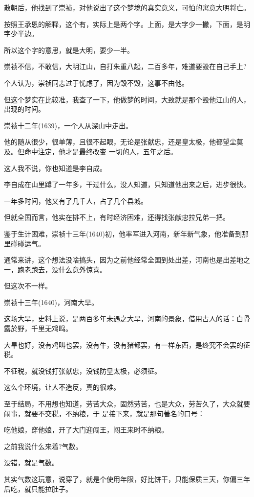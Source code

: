 \documentclass[11pt,a4paper,onecolumn]{article}
\begin{document}
散朝后，他找到了崇祯，对他说出了这个梦境的真实意义，可怕的寓意\myrule 大明将亡。

按照王承恩的解释，这个有，实际上是两个字。上面，是大字少一撇，下面，是明字少半边。

所以这个字的意思，就是大明，要少一半。

崇祯不信，不敢信，大明江山，自打朱重八起，二百多年，难道要毁在自己手上?

个人认为，崇祯同志过于忧虑了，因为毁不毁，这事不由他。

但这个梦实在比较准，我查了一下，他做梦的时间，大致就是那个毁他江山的人，出现的时间。

崇祯十二年(1639)，一个人从深山中走出。

他的随从很少，很单薄，且很不起眼，无论是张献忠，还是皇太极，他都望尘莫及。但命中注定，他才是最终改变
一切的人，五年之后。

这人我不说，你也知道是李自成。

李自成在山里蹲了一年多，干过什么，没人知道，只知道他出来之后，进步很快。

一年多时间，他又有了几千人，占了几个县城。

但就全国而言，他实在排不上，有时经济困难，还得找张献忠拉兄弟一把。

鉴于生计困难，崇祯十三年(1640)初，他率军进入河南，新年新气象，他准备到那里碰碰运气。

通常来讲，这个想法没啥搞头，因为之前他经常全国到处出差，河南也是出差地之一，跑老跑去，没什么意外惊喜。

但这次不一样。

崇祯十三年(1640)，河南大旱。

这场大旱，史料上说，是两百多年未遇之大旱，河南的景象，借用古人的话：白骨露於野，千里无鸡鸣。

大旱也好，没有鸡叫也罢，没有牛，没有猪都罢，有一样东西，是终究不会罢的\myrule 征税。

不征税，就没钱打张献忠，没钱防皇太极，必须征。

这么个环境，让人不造反，真的很难。

至于结局，不用想也知道，劳苦大众，固然劳苦，也是大众，劳苦久了，大众就要闹事，就要不交税，不纳粮，于
是接下来，就是那句著名的口号：

吃他娘，穿他娘，开了大门迎闯王，闯王来时不纳粮。

之前我说什么来着?气数。

没错，就是气数。

其实气数这玩意，说穿了，就是个使用年限，好比饼干，只能保质三天，你偏三年后吃，就只能拉肚子。
\end{document}
